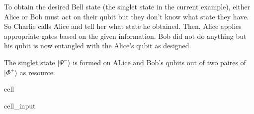 \documentclass[letterpaper,10pt,english]{jupyterBook}
\begin{document}
\sphinxAtStartPar
{}

\sphinxAtStartPar
To obtain the desired Bell state (the singlet state in the current example), either Alice or Bob must act on their qubit but they don’t know  what state they have.  So Charlie calls Alice and tell her what state he obtained.  Then, Alice applies appropriate gates based on the given information.  Bob did not do anything but his qubit is now entangled with the Alice’s qubit as designed.

\sphinxAtStartPar
{}

\sphinxAtStartPar
The singlet state \(|\Psi^{-}\rangle\) is formed on ALice and Bob’s qubits out of two paires of \(|\Phi^{+}\rangle\) as resource.

\begin{sphinxuseclass}{cell}\begin{sphinxVerbatimInput}

\begin{sphinxuseclass}{cell_input}
\begin{sphinxVerbatim}[commandchars=\\\{\}]
   
      
     
   
  




\end{sphinxVerbatim}
\end{sphinxuseclass}
\end{sphinxVerbatimInput}
\end{sphinxuseclass}
\end{document}
